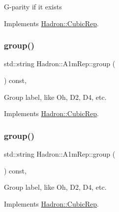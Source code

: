 G-\/parity if it exists 

Implements \mbox{\hyperlink{structHadron_1_1CubicRep_a52104e43266d1614c00bbd1c3b395458}{Hadron\+::\+Cubic\+Rep}}.

\mbox{\label{structHadron_1_1A1mRep_ae00884f3e71e9d2bae09de842d23df0d}} 
\subsubsection{\texorpdfstring{group()}{group()}\hspace{0.1cm}{\footnotesize\ttfamily [1/3]}}
{\footnotesize\ttfamily std\+::string Hadron\+::\+A1m\+Rep\+::group (\begin{DoxyParamCaption}{ }\end{DoxyParamCaption}) const\hspace{0.3cm}{\ttfamily [inline]}, {\ttfamily [virtual]}}

Group label, like Oh, D2, D4, etc. 

Implements \mbox{\hyperlink{structHadron_1_1CubicRep_a0748f11ec87f387062c8e8981339a29c}{Hadron\+::\+Cubic\+Rep}}.

\mbox{\label{structHadron_1_1A1mRep_ae00884f3e71e9d2bae09de842d23df0d}} 
\subsubsection{\texorpdfstring{group()}{group()}\hspace{0.1cm}{\footnotesize\ttfamily [2/3]}}
{\footnotesize\ttfamily std\+::string Hadron\+::\+A1m\+Rep\+::group (\begin{DoxyParamCaption}{ }\end{DoxyParamCaption}) const\hspace{0.3cm}{\ttfamily [inline]}, {\ttfamily [virtual]}}

Group label, like Oh, D2, D4, etc. 

Implements \mbox{\hyperlink{structHadron_1_1CubicRep_a0748f11ec87f387062c8e8981339a29c}{Hadron\+::\+Cubic\+Rep}}.

\mbox{\label{structHadron_1_1A1mRep_ae00884f3e71e9d2bae09de842d23df0d}} 
